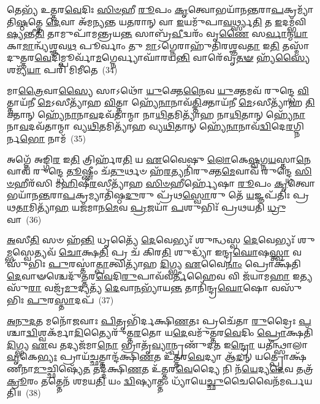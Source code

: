 {\anuvakamend[{𑌯𑌾\-\ul{𑌤}\-𑌵𑍈 𑌹᳴\-\ul{𑌵𑌿}\-𑌰𑍍𑌧𑌾𑌨᳴𑌞𑍍𑌚 \ul{𑌪}\-𑌶𑍂\-\ul{𑌨𑍍𑌪𑌾}\-𑌪𑍍𑌮\-\ul{𑌨𑌾}\-\-𑌽𑌷𑍍𑌟𑌾𑌦᳴𑌶 𑌚}]}%

𑌤𑍇𑌭𑍍𑌯᳴ 𑌉𑌤𑍍𑌤𑌰\-\ul{𑌵𑍇}\-𑌦𑌿𑌃 \ul{𑌸𑌿}\-\-\ul{𑍞}\-𑌹𑍀 \ul{𑌰𑍂}\-𑌪𑌂 \ul{𑌕𑍃}\-𑌤𑍍𑌵𑍋𑌭𑌯𑌾᳴𑌨\-\ul{𑌨𑍍𑌤}\-𑌰𑌾\-\ul{𑌪}\-𑌕𑍍𑌰𑌮𑍍𑌯𑌾᳴𑌤𑌿\-\ul{𑌷𑍍𑌠}\-𑌤𑍍𑌤𑍇 \ul{𑌦𑍇}\-𑌵𑌾 𑌅᳴𑌮𑌨𑍍𑌯𑌨𑍍𑌤 𑌯\-\ul{𑌤}\-𑌰𑌾𑌨𑍍 𑌵𑌾 \ul{𑌇}\-𑌯𑌮𑍁᳴𑌪𑌾\-\ul{𑌵}\-𑌰𑍍𑌥𑍍𑌸𑍍𑌯\-\ul{𑌤𑌿} 𑌤 \ul{𑌇}\-𑌦𑌮𑍍𑌭᳴𑌵𑌿\-\ul{𑌷𑍍𑌯}\-𑌨𑍍𑌤𑍀\-\ul{𑌤𑌿} 𑌤𑌾𑌮𑍁𑌪𑌾᳴𑌮𑌨𑍍𑌤𑍍𑌰𑌯\-\ul{𑌨𑍍𑌤} 𑌸𑌾𑌬𑍍𑌰᳴\-\ul{𑌵𑍀}\-𑌦𑍍𑌵𑌰𑌂᳴ 𑌵𑍃\-\ul{𑌣𑍈} 𑌸\-\ul{𑌰𑍍𑌵𑌾}\-𑌨𑍍𑌮\-\ul{𑌯𑌾} 𑌕𑌾\-\ul{𑌮𑌾}\-𑌨𑍍𑌵𑍍𑌯᳴𑌶𑍍𑌞𑌵\-\ul{𑌥} 𑌪𑍂𑌰𑍍𑌵𑌾𑌂 𑌤𑍁 \ul{𑌮𑌾}\-\-𑌽𑌗𑍍𑌨𑍇𑌰𑌾𑌹𑍁᳴𑌤𑌿𑌰𑌶𑍍𑌞𑌵\-\ul{𑌤𑌾} 𑌇\-\ul{𑌤𑌿} 𑌤𑌸𑍍𑌮𑌾᳴𑌦𑍁𑌤𑍍𑌤𑌰\-\ul{𑌵𑍇}\-𑌦𑌿𑌮𑍍𑌪𑍂𑌰𑍍𑌵𑌾᳴\-\ul{𑌮}\-𑌗𑍍𑌨𑍇𑌰𑍍𑌵𑍍𑌯𑌾𑌘𑌾᳴𑌰𑌯\-\ul{𑌨𑍍𑌤𑌿} 𑌵𑌾𑌰𑍇᳴𑌵𑍃\-\ul{𑌤}\-\-\ul{𑍟} 𑌹𑍍𑌯᳴\-\ul{𑌸𑍍𑌯𑍈} 𑌶𑌮𑍍𑌯᳴\-\ul{𑌯𑌾} 𑌪𑌰𑌿᳴ 𑌮𑌿𑌮𑍀𑌤𑍇~(34)

𑌮𑌾\-\ul{𑌤𑍍𑌰𑍈}\-𑌵𑌾\-\ul{𑌸𑍍𑌯𑍈} 𑌸𑌾\-𑌽𑌥𑍋᳴ \ul{𑌯𑍁}\-𑌕𑍍𑌤𑍇\-\ul{𑌨𑍈}\-𑌵 \ul{𑌯𑍁}\-𑌕𑍍𑌤𑌮𑌵᳴ 𑌰𑍁𑌨𑍍𑌦𑍍𑌧𑍇 \ul{𑌵𑌿}\-𑌤𑍍𑌤𑌾𑌯᳴𑌨𑍀 \ul{𑌮𑍇}\-\-𑌽𑌸𑍀𑌤𑍍𑌯𑌾᳴𑌹 \ul{𑌵𑌿}\-𑌤𑍍𑌤𑌾 𑌹𑍍𑌯𑍇᳴\-\ul{𑌨𑌾}\-𑌨𑌾𑌵᳴\-\ul{𑌤𑍍𑌤𑌿}\-𑌕𑍍𑌤𑌾𑌯᳴𑌨𑍀 \ul{𑌮𑍇}\-\-𑌽𑌸𑍀𑌤𑍍𑌯𑌾᳴𑌹 \ul{𑌤𑌿}\-𑌕𑍍𑌤𑌾𑌨𑍍 𑌹𑍍𑌯𑍇᳴\-\ul{𑌨𑌾}\-𑌨𑌾\-\ul{𑌵}\-𑌦𑌵᳴𑌤𑌾𑌨𑍍𑌮𑌾 𑌨𑌾\-\ul{𑌥𑌿}\-𑌤𑌮𑌿𑌤𑍍𑌯𑌾᳴𑌹 𑌨𑌾\-\ul{𑌥𑌿}\-𑌤𑌾𑌨𑍍 𑌹𑍍𑌯𑍇᳴\-\ul{𑌨𑌾}\-𑌨𑌾\-\ul{𑌵}\-𑌦𑌵᳴𑌤𑌾𑌨𑍍𑌮𑌾 𑌵𑍍𑌯\-\ul{𑌥𑌿}\-𑌤𑌮𑌿𑌤𑍍𑌯𑌾᳴𑌹 𑌵𑍍𑌯\-\ul{𑌥𑌿}\-𑌤𑌾𑌨𑍍 𑌹𑍍𑌯𑍇᳴\-\ul{𑌨𑌾}\-𑌨𑌾𑌵᳴\-\ul{𑌦𑍍𑌵𑌿}\-𑌦𑍇\-\ul{𑌰}\-𑌗𑍍𑌨𑌿𑌰𑍍𑌨\-\ul{𑌭𑍋} 𑌨𑌾𑌮᳴~(35)

𑌅𑌗𑍍𑌨𑍇᳴ 𑌅𑌙𑍍𑌗𑌿\-\ul{𑌰} 𑌇\-\ul{𑌤𑌿} 𑌤𑍍𑌰𑌿𑌰𑍍\mbox{}𑌹᳴𑌰\-\ul{𑌤𑌿} 𑌯 \ul{𑌏}\-𑌵𑍈𑌷𑍁 \ul{𑌲𑍋}\-𑌕𑍇\-\ul{𑌷𑍍𑌵}\-𑌗𑍍𑌨\-\ul{𑌯}\-𑌸𑍍𑌤𑌾\-\ul{𑌨𑍇}\-𑌵𑌾𑌵᳴ 𑌰𑍁𑌨𑍍𑌦𑍍𑌧𑍇 \ul{𑌤𑍂}\-𑌷𑍍𑌣𑍀𑌂 𑌚᳴\-\ul{𑌤𑍁}\-𑌰𑍍𑌥𑍞 𑌹᳴\-\ul{𑌰}\-𑌤𑍍𑌯𑌨𑌿᳴𑌰𑍁𑌕𑍍𑌤\-\ul{𑌮𑍇}\-𑌵𑌾𑌵᳴ 𑌰𑍁𑌨𑍍𑌦𑍍𑌧𑍇 \ul{𑌸𑌿}\-\-\ul{𑍞}\-𑌹𑍀𑌰᳴𑌸𑌿 𑌮\-\ul{𑌹𑌿}\-𑌷𑍀\-\ul{𑌰}\-𑌸𑍀𑌤𑍍𑌯𑌾᳴𑌹 \ul{𑌸𑌿}\-\-\ul{𑍞}\-𑌹𑍀𑌰𑍍\mbox{}𑌹𑍍𑌯𑍇᳴𑌷𑌾 \ul{𑌰𑍂}\-𑌪𑌂 \ul{𑌕𑍃}\-𑌤𑍍𑌵𑍋𑌭𑌯𑌾᳴𑌨\-\ul{𑌨𑍍𑌤}\-𑌰𑌾\-\ul{𑌪}\-𑌕𑍍𑌰𑌮𑍍𑌯𑌾𑌤𑌿᳴𑌷𑍍𑌠\-\ul{𑌦𑍁}\-𑌰𑍁 𑌪𑍍𑌰᳴𑌥\-\ul{𑌸𑍍𑌵𑍋}\-𑌰𑍁 𑌤𑍇᳴ \ul{𑌯}\-𑌜𑍍𑌞𑌪᳴𑌤𑌿𑌃 𑌪𑍍𑌰𑌥\-\ul{𑌤𑌾}\-𑌮𑌿𑌤𑍍𑌯𑌾᳴\-\ul{𑌹} 𑌯𑌜᳴𑌮𑌾𑌨\-\ul{𑌮𑍇}\-𑌵 \ul{𑌪𑍍𑌰}\-𑌜𑌯𑌾᳴ \ul{𑌪}\-𑌶𑍁𑌭𑌿𑌃᳴ 𑌪𑍍𑌰𑌥𑌯𑌤𑌿 \ul{𑌧𑍍𑌰𑍁}\-𑌵𑌾~(36)

\-\ul{𑌅}\-𑌸𑍀\-\ul{𑌤𑌿} 𑌸𑍞 𑌹᳴\-\ul{𑌨𑍍𑌤𑌿} 𑌧𑍃𑌤𑍍𑌯𑍈᳴ \ul{𑌦𑍇}\-𑌵𑍇𑌭𑍍𑌯𑌃᳴ 𑌶𑍁𑌨𑍍𑌧𑌸𑍍𑌵 \ul{𑌦𑍇}\-𑌵𑍇𑌭𑍍𑌯𑌃᳴ 𑌶𑍁\-\ul{𑌮𑍍𑌭}\-𑌸𑍍𑌵𑍇𑌤𑍍𑌯𑌵᳴ \ul{𑌚𑍋}\-𑌕𑍍𑌷\-\ul{𑌤𑌿} 𑌪𑍍𑌰 𑌚᳴ 𑌕𑌿𑌰\-\ul{𑌤𑌿} 𑌶𑍁𑌦𑍍𑌧𑍍𑌯𑌾᳴ 𑌇𑌨𑍍𑌦𑍍𑌰\-\ul{𑌘𑍋}\-𑌷\-\ul{𑌸𑍍𑌤𑍍𑌵𑌾} 𑌵𑌸𑍁᳴𑌭𑌿𑌃 \ul{𑌪𑍁}\-𑌰𑌸𑍍𑌤𑌾॑\-\ul{𑌤𑍍𑌪𑌾}\-𑌤𑍍𑌵𑌿𑌤𑍍𑌯𑌾᳴𑌹 \ul{𑌦𑌿}\-𑌗𑍍𑌭𑍍𑌯 \ul{𑌏}\-𑌵𑍈\-\ul{𑌨𑌾𑌂} 𑌪𑍍𑌰𑍋𑌕𑍍𑌷᳴𑌤𑌿 \ul{𑌦𑍇}\-𑌵𑌾𑍟𑌶𑍍𑌚𑍇𑌦𑍁᳴𑌤𑍍𑌤𑌰\-\ul{𑌵𑍇}\-𑌦𑌿\-\ul{𑌰𑍁}\-𑌪𑌾𑌵᳴𑌵\-\ul{𑌰𑍍𑌤𑍀}\-𑌹𑍈𑌵 𑌵𑌿 𑌜᳴𑌯𑌾𑌮\-\ul{𑌹𑌾} 𑌇𑌤𑍍𑌯𑌸𑍁᳴\-\ul{𑌰𑌾} 𑌵𑌜𑍍𑌰᳴\-\ul{𑌮𑍁}\-𑌦𑍍𑌯𑌤𑍍𑌯᳴ \ul{𑌦𑍇}\-𑌵𑌾\-\ul{𑌨}\-𑌭𑍍𑌯𑌾᳴𑌯\-\ul{𑌨𑍍𑌤} 𑌤𑌾𑌨𑌿᳴𑌨𑍍𑌦𑍍𑌰\-\ul{𑌘𑍋}\-𑌷𑍋 𑌵𑌸𑍁᳴𑌭𑌿𑌃 \ul{𑌪𑍁}\-𑌰\-\ul{𑌸𑍍𑌤𑌾}\-𑌦𑌪᳴~(37)

\-\ul{𑌅}\-\-\ul{𑌨𑍁}\-\-\ul{𑌦}\-\-\ul{𑌤} 𑌮𑌨𑍋᳴𑌜𑌵𑌾𑌃 \ul{𑌪𑌿}\-𑌤𑍃𑌭𑌿᳴𑌰𑍍𑌦𑌕𑍍𑌷𑌿\-\ul{𑌣}\-𑌤𑌃 𑌪𑍍𑌰𑌚𑍇᳴𑌤𑌾 \ul{𑌰𑍁}\-𑌦𑍍𑌰𑍈𑌃 \ul{𑌪}\-𑌶𑍍𑌚𑌾\-\ul{𑌦𑍍𑌵𑌿}\-𑌶𑍍𑌵𑌕᳴𑌰𑍍𑌮𑌾\-\ul{𑌦𑌿}\-𑌤𑍍𑌯𑍈𑌰𑍁᳴𑌤𑍍𑌤\-\ul{𑌰}\-𑌤𑍋 𑌯\-\ul{𑌦𑍇}\-𑌵𑌮𑍁᳴𑌤𑍍𑌤𑌰\-\ul{𑌵𑍇}\-𑌦𑌿𑌂 \ul{𑌪𑍍𑌰𑍋}\-𑌕𑍍𑌷𑌤𑌿᳴ \ul{𑌦𑌿}\-𑌗𑍍𑌭𑍍𑌯 \ul{𑌏}\-𑌵 𑌤𑌦𑍍𑌯𑌜᳴𑌮𑌾\-\ul{𑌨𑍋} 𑌭𑍍𑌰𑌾𑌤𑍃᳴\-\ul{𑌵𑍍𑌯𑌾}\-𑌨𑍍𑌪𑍍𑌰𑌣𑍁᳴𑌦\-\ul{𑌤} 𑌇\-\ul{𑌨𑍍𑌦𑍍𑌰𑍋} 𑌯𑌤𑍀॑𑌨𑍍𑌥𑍍𑌸𑌾𑌲𑌾\-\ul{𑌵𑍃}\-𑌕𑍇\-\ul{𑌭𑍍𑌯𑌃} 𑌪𑍍𑌰𑌾𑌯᳴\-\ul{𑌚𑍍𑌛}\-𑌤𑍍𑌤𑌾𑌨𑍍𑌦᳴𑌕𑍍𑌷𑌿\-\ul{𑌣}\-𑌤 𑌉᳴𑌤𑍍𑌤𑌰\-\ul{𑌵𑍇}\-𑌦𑍍𑌯𑌾 𑌆᳴\-\ul{𑌦}\-𑌨𑍍 𑌯𑌤𑍍𑌪𑍍𑌰𑍋𑌕𑍍𑌷᳴𑌣𑍀𑌨𑌾\-\ul{𑌮𑍁}\-𑌚𑍍𑌛𑌿𑌷𑍍𑌯𑍇᳴\-\ul{𑌤} 𑌤𑌦𑍍𑌦᳴𑌕𑍍𑌷𑌿\-\ul{𑌣}\-𑌤 𑌉᳴𑌤𑍍𑌤𑌰\-\ul{𑌵𑍇}\-𑌦𑍍𑌯𑍈 𑌨𑌿 𑌨᳴\-\ul{𑌯𑍇}\-𑌦𑍍𑌯\-\ul{𑌦𑍇}\-𑌵 𑌤𑌤𑍍𑌰᳴ \ul{𑌕𑍍𑌰𑍂}\-𑌰𑌂 𑌤𑌤𑍍𑌤𑍇𑌨᳴ 𑌶𑌮𑌯\-\ul{𑌤𑌿} 𑌯𑌂 \ul{𑌦𑍍𑌵𑌿}\-𑌷𑍍𑌯𑌾𑌤𑍍𑌤𑌂 𑌧𑍍𑌯𑌾᳴𑌯𑍇\-\ul{𑌚𑍍𑌛𑍁}\-𑌚𑍈𑌵𑍈𑌨᳴𑌮𑌰𑍍𑌪𑌯𑌤𑌿॥~(38)

